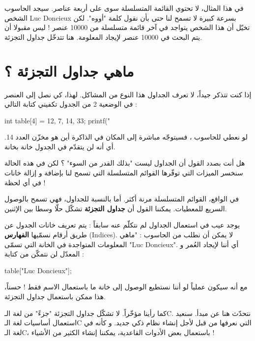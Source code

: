 في هذا المثال، لا تحتوي القائمة المتسلسلة سوى على أربعة عناصر. سيجد الحاسوب الشخص 
\textenglish{Luc Doncieux}
بسرعة كبيرة لا تسمح لنا حتى بأن نقول كلمة "أووه". لكن تخيّل أن هذا الشخص يتواجد في آخر قائمة متسلسلة من 10000 عنصر ! ليس مقبولا أن يتم البحث في 10000 عنصر لإيجاد المعلومة. هنا تتدخّل جداول التجزئة.

\section{ماهي جداول التجزئة ؟}

إذا كنت تتذكر جيداً، لا تعرف الجداول هذا النوع من المشاكل. لهذا، كي نصل إلى العنصر في الوضعية 2 من الجدول تكفيني كتابة التالي :

\begin{Csource}
int table[4] = {12, 7, 14, 33};
printf("%
\end{Csource}

لو نعطي للحاسوب
،
فسيتوجّه مباشرة إلى المكان في الذاكرة أين هو مخزّن العدد 14. أي أنه لن يتقدّم في الجدول خانة بخانة.

\begin{question}
هل أنت بصدد القول أن الجداول ليست "بذلك القدر من السوء" ؟ لكن في هذه الحالة سنخسر الميزات التي توفّرها القوائم المتسلسلة التي تسمح لنا بإضافة و إزالة خانات في أي لحظة !
\end{question}

في الواقع، القوائم المتسلسلة مرنة أكثر. أما بالنسبة للجداول، فهي تسمح بالوصول السريع للمعطيات. يمكننا القول أن 
\textbf{جداول التجزئة}
تشكّل حلّا وسطا بين الإثنين.

يوجد عيب في استعمال الجداول لم نتكلّم عنه سابقاً : يتم تعريف خانات الجدول عن طريق أرقام نسمّيها 
\textbf{الفهارس}
(\textenglish{Indices}).
لا يمكن أن نطلب من الحاسوب : "ماهي المعلومات المتواجدة في الخانة التي تسمّى
"\textenglish{Luc Doncieux}".
أي أننا لإيجاد العُمر و المعدّل لن نتمكّن من كتابة :

\begin{Csource}
table["Luc Doncieux"];
\end{Csource}

مع أنه سيكون عملياً لو أننا نستطيع الوصول إلى خانة ما باستعمال الاسم فقط ! حسناً، هذا ممكن باستعمال جداول التجزئة.

\begin{information}
كما رأينا مؤخّراً. لا تشكّل جداول التجزئة "جزءً" من لغة الـ\textenglish{C}.
نتحدّث هنا عن مبدأ. سنعيد استعمال أساسيات لغة الـ\textenglish{C}
التي نعرفها من قبل لأجل إنشاء نظام ذكي جديد. و كأنه في لغة الـ\textenglish{C}،
باستعمال بعض الأدوات القاعدية، يمكننا إنشاء الكثير من الأشياء !
\end{information}

